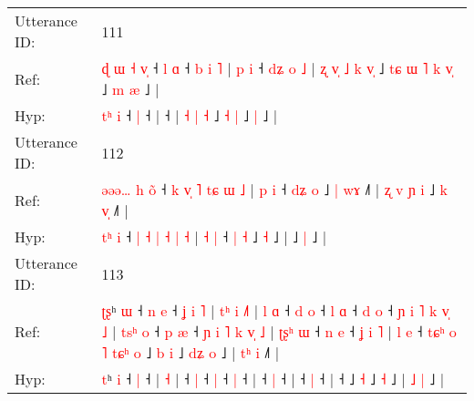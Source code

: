 \documentclass[10pt]{article}
\DeclareRobustCommand{\hl}[1]{{\textcolor{red}{#1}}}
\begin{document}
\begin{longtable}{ll}
 \\
\midrule
Utterance ID: & 111 \\
Ref: & \hl{ɖ}\hl{ }\hl{ɯ}\hl{ }\hl{˧} \hl{v}\hl{̩} ˧\hl{ }\hl{l} \hl{ɑ} ˧\hl{ }\hl{b}\hl{ }\hl{i}\hl{ }\hl{˥} |\hl{ }\hl{p}\hl{ }\hl{i} ˧\hl{ }\hl{d}\hl{ʑ}\hl{ }\hl{o}\hl{ }\hl{˩} |\hl{ }\hl{ʐ}\hl{ }\hl{v}\hl{̩} \hl{˩} \hl{k} \hl{v}\hl{̩} ˩\hl{ }\hl{t}\hl{ɕ}\hl{ }\hl{ɯ}\hl{ }\hl{˥} \hl{k} \hl{v}\hl{̩} ˩\hl{ }\hl{m} \hl{æ} ˩ |
 \\
Hyp: & \hl{}\hl{}\hl{}\hl{t}\hl{ʰ} \hl{}\hl{i} ˧\hl{}\hl{} \hl{|} ˧\hl{}\hl{}\hl{}\hl{}\hl{}\hl{} |\hl{}\hl{}\hl{}\hl{} ˧\hl{}\hl{}\hl{}\hl{}\hl{}\hl{}\hl{} |\hl{}\hl{}\hl{}\hl{}\hl{} \hl{˧} \hl{|} \hl{}\hl{˧} ˩\hl{}\hl{}\hl{}\hl{}\hl{}\hl{}\hl{} \hl{˧} \hl{}\hl{|} ˩\hl{}\hl{} \hl{|} ˩ |
 \\
\midrule
Utterance ID: & 112 \\
Ref: & \hl{ə}\hl{ə}\hl{ə}\hl{…}\hl{ }\hl{h} \hl{o}\hl{̃} ˧ \hl{k} \hl{v}\hl{̩} \hl{˥} \hl{t}\hl{ɕ} \hl{ɯ} \hl{˩} | \hl{p} \hl{i} ˧ \hl{d}\hl{ʑ} \hl{o} ˩\hl{ }\hl{|} \hl{w}\hl{ɤ} ˩\hl{˥} |\hl{ }\hl{ʐ}\hl{ }\hl{v}\hl{ }\hl{ɲ}\hl{ }\hl{i} ˩\hl{ }\hl{k} \hl{v}\hl{̩} ˩\hl{˥} |
 \\
Hyp: & \hl{}\hl{}\hl{}\hl{}\hl{t}\hl{ʰ} \hl{}\hl{i} ˧ \hl{|} \hl{}\hl{˧} \hl{|} \hl{}\hl{˧} \hl{|} \hl{˧} | \hl{˧} \hl{|} ˧ \hl{}\hl{|} \hl{˧} ˩\hl{}\hl{} \hl{}\hl{˧} ˩\hl{} |\hl{}\hl{}\hl{}\hl{}\hl{}\hl{}\hl{}\hl{} ˩\hl{}\hl{} \hl{}\hl{|} ˩\hl{} |
 \\
\midrule
Utterance ID: & 113 \\
Ref: & \hl{ʈ}\hl{ʂ}ʰ \hl{ɯ} ˧\hl{ }\hl{n} \hl{e} ˧\hl{ }\hl{ʝ}\hl{ }\hl{i}\hl{ }\hl{˥} |\hl{ }\hl{t}\hl{ʰ}\hl{ }\hl{i} \hl{˩}\hl{˥} |\hl{ }\hl{l}\hl{ }\hl{ɑ} ˧\hl{ }\hl{d} \hl{o} ˧\hl{ }\hl{l} \hl{ɑ} ˧\hl{ }\hl{d} \hl{o} ˧\hl{ }\hl{ɲ}\hl{ }\hl{i}\hl{ }\hl{˥}\hl{ }\hl{k}\hl{ }\hl{v}\hl{̩}\hl{ }\hl{˩} |\hl{ }\hl{t}\hl{s}\hl{ʰ}\hl{ }\hl{o} ˧\hl{ }\hl{p} \hl{æ} ˧\hl{ }\hl{ɲ}\hl{ }\hl{i}\hl{ }\hl{˥}\hl{ }\hl{k}\hl{ }\hl{v}\hl{̩}\hl{ }\hl{˩} |\hl{ }\hl{ʈ}\hl{ʂ}\hl{ʰ}\hl{ }\hl{ɯ} ˧\hl{ }\hl{n} \hl{e} ˧\hl{ }\hl{ʝ}\hl{ }\hl{i}\hl{ }\hl{˥} |\hl{ }\hl{l}\hl{ }\hl{e} ˧\hl{ }\hl{t}\hl{ɕ}\hl{ʰ}\hl{ }\hl{o}\hl{ }\hl{˥}\hl{ }\hl{t}\hl{ɕ}\hl{ʰ}\hl{ }\hl{o} ˩\hl{ }\hl{b} \hl{i} ˩\hl{ }\hl{d}\hl{ʑ} \hl{o} ˩ | \hl{t}\hl{ʰ} \hl{i} ˩\hl{˥} |
 \\
Hyp: & \hl{}\hl{t}ʰ \hl{i} ˧\hl{}\hl{} \hl{|} ˧\hl{}\hl{}\hl{}\hl{}\hl{}\hl{} |\hl{}\hl{}\hl{}\hl{}\hl{} \hl{}\hl{˧} |\hl{}\hl{}\hl{}\hl{} ˧\hl{}\hl{} \hl{|} ˧\hl{}\hl{} \hl{|} ˧\hl{}\hl{} \hl{|} ˧\hl{}\hl{}\hl{}\hl{}\hl{}\hl{}\hl{}\hl{}\hl{}\hl{}\hl{}\hl{}\hl{} |\hl{}\hl{}\hl{}\hl{}\hl{}\hl{} ˧\hl{}\hl{} \hl{|} ˧\hl{}\hl{}\hl{}\hl{}\hl{}\hl{}\hl{}\hl{}\hl{}\hl{}\hl{}\hl{}\hl{} |\hl{}\hl{}\hl{}\hl{}\hl{}\hl{} ˧\hl{}\hl{} \hl{|} ˧\hl{}\hl{}\hl{}\hl{}\hl{}\hl{} |\hl{}\hl{}\hl{}\hl{} ˧\hl{}\hl{}\hl{}\hl{}\hl{}\hl{}\hl{}\hl{}\hl{}\hl{}\hl{}\hl{}\hl{}\hl{} ˩\hl{}\hl{} \hl{˧} ˩\hl{}\hl{}\hl{} \hl{˧} ˩ | \hl{}\hl{˩} \hl{|} ˩\hl{} |

\end{longtable}
\end{document}
